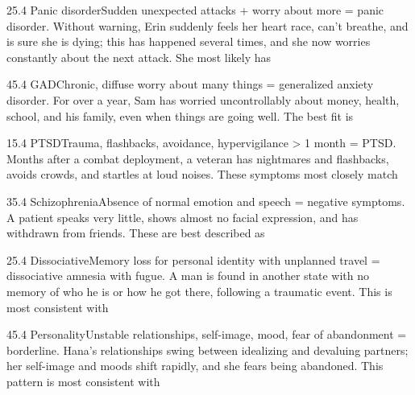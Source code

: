 \documentclass[11pt]{article}
\begin{document}
\begin{q}{2}{5.4 Panic disorder}{Sudden unexpected attacks + worry about more = panic disorder.}
Without warning, Erin suddenly feels her heart race, can't breathe, and is sure she is dying; this has happened several times, and she now worries constantly about the next attack. She most likely has
\end{q}

\begin{q}{4}{5.4 GAD}{Chronic, diffuse worry about many things = generalized anxiety disorder.}
For over a year, Sam has worried uncontrollably about money, health, school, and his family, even when things are going well. The best fit is
\end{q}

\begin{q}{1}{5.4 PTSD}{Trauma, flashbacks, avoidance, hypervigilance > 1 month = PTSD.}
Months after a combat deployment, a veteran has nightmares and flashbacks, avoids crowds, and startles at loud noises. These symptoms most closely match
\end{q}

\begin{q}{3}{5.4 Schizophrenia}{Absence of normal emotion and speech = negative symptoms.}
A patient speaks very little, shows almost no facial expression, and has withdrawn from friends. These are best described as
\end{q}

\begin{q}{2}{5.4 Dissociative}{Memory loss for personal identity with unplanned travel = dissociative amnesia with fugue.}
A man is found in another state with no memory of who he is or how he got there, following a traumatic event. This is most consistent with
\end{q}

\begin{q}{4}{5.4 Personality}{Unstable relationships, self-image, mood, fear of abandonment = borderline.}
Hana's relationships swing between idealizing and devaluing partners; her self-image and moods shift rapidly, and she fears being abandoned. This pattern is most consistent with
\end{q}
\end{document}
